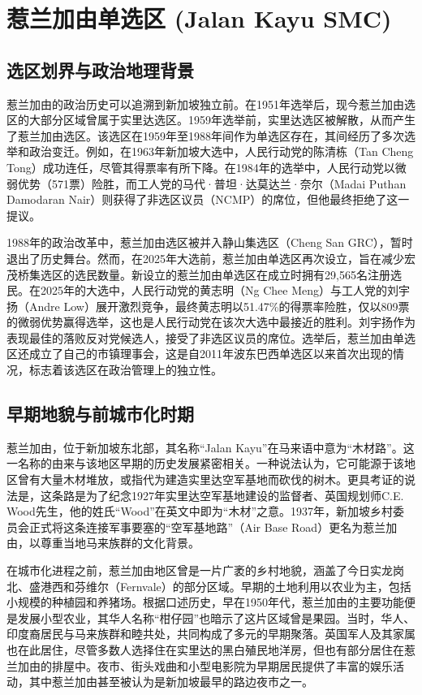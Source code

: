 \documentclass[11pt,a4paper,twoside,openany]{book}
\begin{document}
\chapter{惹兰加由单选区 (Jalan Kayu SMC)}

\section{选区划界与政治地理背景}
惹兰加由的政治历史可以追溯到新加坡独立前。在1951年选举后，现今惹兰加由选区的大部分区域曾属于实里达选区。1959年选举前，实里达选区被解散，从而产生了惹兰加由选区。该选区在1959年至1988年间作为单选区存在，其间经历了多次选举和政治变迁。例如，在1963年新加坡大选中，人民行动党的陈清栋（Tan Cheng Tong）成功连任，尽管其得票率有所下降。在1984年的选举中，人民行动党以微弱优势（571票）险胜，而工人党的马代·普坦·达莫达兰·奈尔（Madai Puthan Damodaran Nair）则获得了非选区议员（NCMP）的席位，但他最终拒绝了这一提议。

1988年的政治改革中，惹兰加由选区被并入静山集选区（Cheng San GRC），暂时退出了历史舞台。然而，在2025年大选前，惹兰加由单选区再次设立，旨在减少宏茂桥集选区的选民数量。新设立的惹兰加由单选区在成立时拥有29,565名注册选民。在2025年的大选中，人民行动党的黄志明（Ng Chee Meng）与工人党的刘宇扬（Andre Low）展开激烈竞争，最终黄志明以51.47\%的得票率险胜，仅以809票的微弱优势赢得选举，这也是人民行动党在该次大选中最接近的胜利。刘宇扬作为表现最佳的落败反对党候选人，接受了非选区议员的席位。选举后，惹兰加由单选区还成立了自己的市镇理事会，这是自2011年波东巴西单选区以来首次出现的情况，标志着该选区在政治管理上的独立性。

\section{早期地貌与前城市化时期}
惹兰加由，位于新加坡东北部，其名称“Jalan Kayu”在马来语中意为“木材路”。这一名称的由来与该地区早期的历史发展紧密相关。一种说法认为，它可能源于该地区曾有大量木材堆放，或指代为建造实里达空军基地而砍伐的树木。更具考证的说法是，这条路是为了纪念1927年实里达空军基地建设的监督者、英国规划师C.E. Wood先生，他的姓氏“Wood”在英文中即为“木材”之意。1937年，新加坡乡村委员会正式将这条连接军事要塞的“空军基地路”（Air Base Road）更名为惹兰加由，以尊重当地马来族群的文化背景。

在城市化进程之前，惹兰加由地区曾是一片广袤的乡村地貌，涵盖了今日实龙岗北、盛港西和芬维尔（Fernvale）的部分区域。早期的土地利用以农业为主，包括小规模的种植园和养猪场。根据口述历史，早在1950年代，惹兰加由的主要功能便是发展小型农业，其华人名称“柑仔园”也暗示了这片区域曾是果园。当时，华人、印度裔居民与马来族群和睦共处，共同构成了多元的早期聚落。英国军人及其家属也在此居住，尽管多数人选择住在实里达的黑白殖民地洋房，但也有部分居住在惹兰加由的排屋中。夜市、街头戏曲和小型电影院为早期居民提供了丰富的娱乐活动，其中惹兰加由甚至被认为是新加坡最早的路边夜市之一。
\end{document}
